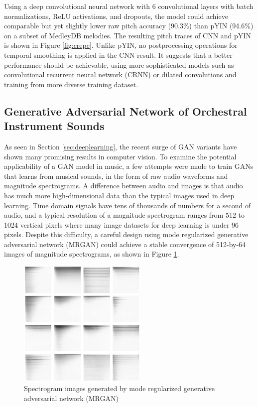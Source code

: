 Using a deep convolutional neural network with 6 convolutional layers with batch normalizations, ReLU activations, and dropouts, the model could achieve comparable but yet slightly lower raw pitch accuracy (90.3\%) than pYIN (94.6\%) on a subset of MedleyDB \cite{bittner2014medleydb} melodies.
The resulting pitch traces of CNN and pYIN is shown in Figure \ref{fig:crepe}.
Unlike pYIN, no postprocessing operations for temporal smoothing is applied in the CNN result.
It suggests that a better performance should be achievable, using more sophisticated models such as convolutional recurrent neural network (CRNN) or dilated convolutions and training from more diverse training dataset.


\subsection{Generative Adversarial Network of Orchestral Instrument Sounds}

As seen in Section \ref{sec:deeplearning}, the recent surge of GAN variants have shown many promising results in computer vision.
To examine the potential applicability of a GAN model in music, a few attempts were made to train GANs that learns from musical sounds, in the form of raw audio waveforms and magnitude spectrograms.
A difference between audio and images is that audio has much more high-dimensional data than the typical images used in deep learning.
Time domain signals have tens of thousands of numbers for a second of audio, and a typical resolution of a magnitude spectrogram ranges from 512 to 1024 vertical pixels where many image datasets for deep learning is under 96 pixels.
Despite this difficulty, a careful design using mode regularized generative adversarial network (MRGAN) \cite{che2016mrgan} could achieve a stable convergence of 512-by-64 images of magnitude spectrograms, as shown in Figure \ref{fig:gan}.

\begin{figure}
	\centering
	\includegraphics[width=0.55\textwidth]{gan.jpg}
	\caption{Spectrogram images generated by mode regularized generative adversarial network (MRGAN) %
	}\label{fig:gan}
\end{figure}

